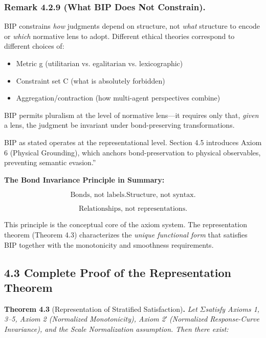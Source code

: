 \documentclass[12pt]{article}
\theoremstyle{plain}
\theoremstyle{definition}
\theoremstyle{remark}
\begin{document}
\subsubsection{\texorpdfstring{Remark 4.2.9 (What BIP Does Not
Constrain).
}{Remark 4.2.9 (What BIP Does Not Constrain). }}\label{remark-4.2.9-what-bip-does-not-constrain.}

BIP constrains \emph{how} judgments depend on structure, not \emph{what}
structure to encode or \emph{which} normative lens to adopt. Different
ethical theories correspond to different choices of:

\begin{itemize}
\item
  Metric g (utilitarian vs. egalitarian vs. lexicographic)
\item
  Constraint set C (what is absolutely forbidden)
\item
  Aggregation/contraction (how multi-agent perspectives combine)
\end{itemize}

BIP permits pluralism at the level of normative lens---it requires only
that, \emph{given} a lens, the judgment be invariant under
bond-preserving transformations.

BIP as stated operates at the representational level. Section 4.5
introduces Axiom 6 (Physical Grounding), which anchors bond-preservation
to physical observables, preventing semantic evasion.''

\textbf{The Bond Invariance Principle in Summary:}

\[{\text{Bonds, not labels.}
}{\text{Structure, not syntax.}
}\]

\[\text{Relationships, not representations.}
\]

This principle is the conceptual core of the axiom system. The
representation theorem (Theorem 4.3) characterizes the \emph{unique
functional form} that satisfies BIP together with the monotonicity and
smoothness requirements.

\subsection{\texorpdfstring{4.3 Complete Proof of the Representation
Theorem
}{4.3 Complete Proof of the Representation Theorem }}\label{complete-proof-of-the-representation-theorem}

\textbf{Theorem 4.3} (Representation of Stratified
Satisfaction)\textbf{.} \emph{Let} \(\Sigma\)\emph{satisfy Axioms 1,
3--5, Axiom 2 (Normalized Monotonicity), Axiom 2′ (Normalized
Response-Curve Invariance), and the Scale Normalization assumption. Then
there exist:}
\end{document}
